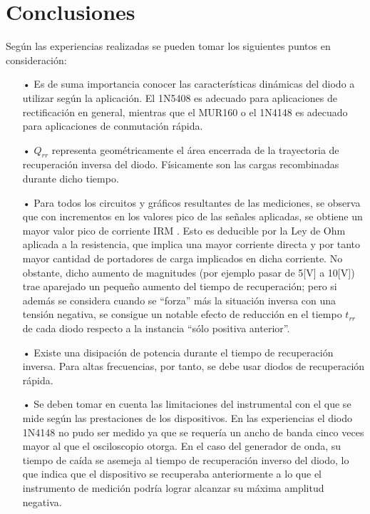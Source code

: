 \documentclass{article}
\begin{document}
\section{Conclusiones}
Según las experiencias realizadas se pueden tomar los siguientes puntos en consideración:
\begin{itemize}
\item[•] Es de suma importancia conocer las características dinámicas del diodo a utilizar según la aplicación. El 1N5408 es adecuado para aplicaciones de rectificación en general, mientras que el MUR160 o el 1N4148 es adecuado para aplicaciones de conmutación rápida.

\item [•] $Q_{rr}$ representa geométricamente el área encerrada de la trayectoria de recuperación inversa del diodo. Físicamente son las cargas recombinadas durante dicho tiempo.

\item [•]	Para todos los circuitos y gráficos resultantes de las mediciones, se observa que con incrementos en los valores pico de las señales aplicadas, se obtiene un mayor valor pico de corriente IRM . Esto es deducible por la Ley de Ohm aplicada a la resistencia, que implica una mayor corriente directa y por tanto mayor cantidad de portadores de carga implicados en dicha corriente. No obstante, dicho aumento de magnitudes (por ejemplo pasar de 5[V] a 10[V]) trae aparejado un pequeño aumento del tiempo de recuperación; pero si además se considera cuando se “forza” más la situación inversa con una tensión negativa, se consigue un notable efecto de reducción en el tiempo $t_{rr}$ de cada diodo respecto a la instancia “sólo positiva anterior”. 

\item [•]Existe una disipación de potencia durante el tiempo de recuperación inversa. Para altas frecuencias, por tanto, se debe usar diodos de recuperación rápida.

\item[•]Se deben tomar en cuenta las limitaciones del instrumental con el que se mide según las prestaciones de los dispositivos. En las experiencias el diodo 1N4148 no pudo ser medido ya que se requería un ancho de banda cinco veces mayor al que el osciloscopio otorga.  En el caso del generador de onda, su tiempo de caída se asemeja al tiempo de recuperación inverso del diodo, lo que indica que el dispositivo se recuperaba anteriormente a lo que el instrumento de medición podría lograr alcanzar su máxima amplitud negativa.

\end{itemize}
\end{document}
